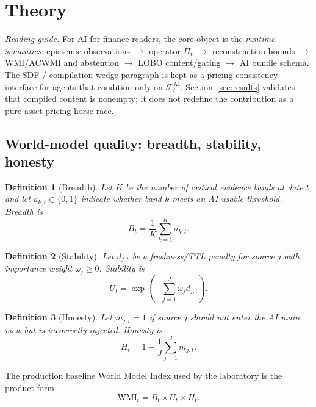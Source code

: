 \documentclass[12pt]{article}
\newtheorem{definition}{Definition}
\begin{document}
\section{Theory}
\label{sec:theory}

\noindent\textit{Reading guide.} For AI-for-finance readers, the core object is the \emph{runtime semantics}: epistemic observations $\rightarrow$ operator $\Pi_t$ $\rightarrow$ reconstruction bounds $\rightarrow$ WMI/ACWMI and abstention $\rightarrow$ LOBO content/gating $\rightarrow$ AI bundle schema. The SDF / compilation-wedge paragraph is kept as a pricing-consistency interface for agents that condition only on $\mathcal{F}^{\mathrm{AI}}_t$. Section~\ref{sec:results} validates that compiled content is nonempty; it does not redefine the contribution as a pure asset-pricing horse-race.

\subsection{World-model quality: breadth, stability, honesty}
\label{sec:wmi}

\begin{definition}[Breadth]
Let $K$ be the number of critical evidence bands at date $t$, and let $a_{k,t}\in\{0,1\}$ indicate whether band $k$ meets an AI-usable threshold. Breadth is
\begin{equation}
B_t=\frac{1}{K}\sum_{k=1}^{K}a_{k,t}.
\label{eq:breadth}
\end{equation}
\end{definition}

\begin{definition}[Stability]
Let $d_{j,t}$ be a freshness/TTL penalty for source $j$ with importance weight $\omega_j\ge 0$. Stability is
\begin{equation}
U_t=\exp\!\left(-\sum_{j=1}^{J}\omega_j d_{j,t}\right).
\label{eq:stability}
\end{equation}
\end{definition}

\begin{definition}[Honesty]
Let $m_{j,t}=1$ if source $j$ should not enter the AI main view but is incorrectly injected. Honesty is
\begin{equation}
H_t=1-\frac{1}{J}\sum_{j=1}^{J}m_{j,t}.
\label{eq:honesty}
\end{equation}
\end{definition}

The production baseline World Model Index used by the laboratory is the product form
\begin{equation}
\mathrm{WMI}_t=B_t\times U_t\times H_t.
\label{eq:wmi}
\end{equation}
\end{document}
